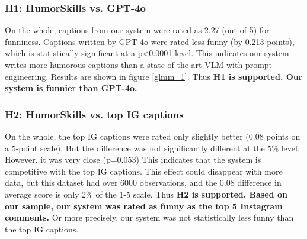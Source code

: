 \subsubsection{H1: HumorSkills vs. GPT-4o}
On the whole, captions from our system were rated as 2.27 (out of 5) for funniness. Captions written by GPT-4o were rated less funny (by 0.213 points), which is statistically significant at a p<0.0001 level. This indicates our system writes more humorous captions than a state-of-the-art VLM with prompt engineering. 
Results are shown in figure \ref{glmm_1}. 
Thus \textbf{H1 is supported. Our system is funnier than GPT-4o.}

\subsubsection{H2: HumorSkills vs. top IG captions}
On the whole, the top IG captions were rated only slightly better (0.08 points on a 5-point scale).
But the difference was not significantly different at the 5\% level. However, it was very close (p=0.053)
This indicates that the system is competitive with the top IG captions. This effect could disappear with more data, but this dataset had over 6000 observations, and the 0.08 difference in average score is only 2\% of the 1-5 scale.
Thus \textbf{H2 is supported. Based on our sample, our system was rated as funny as the top 5 Instagram comments.} Or more precisely, our system was not statistically less funny than the top IG captions. 

